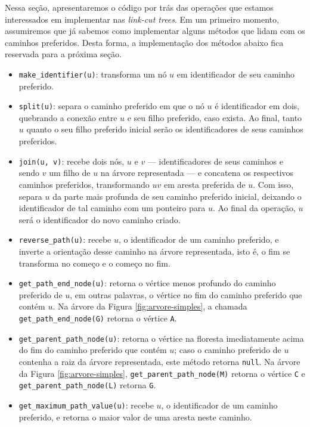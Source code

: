 Nessa seção, apresentaremos o código por trás das operações que estamos interessados em implementar nas \emph{link-cut trees}. Em um primeiro momento, assumiremos que já sabemos como implementar alguns métodos que lidam com os caminhos preferidos. Desta forma, a implementação dos métodos abaixo fica reservada para a próxima seção.

\begin{itemize}
    \item \texttt{make\_identifier(u)}: transforma um nó $u$ em identificador de seu caminho preferido.
    \item \texttt{split(u)}: separa o caminho preferido em que o nó $u$ é identificador em dois, quebrando a conexão entre $u$ e seu filho preferido, caso exista. Ao final, tanto $u$ quanto o seu filho preferido inicial serão os identificadores de seus caminhos preferidos.
    \item \texttt{join(u, v)}: recebe dois nós, $u$ e $v$ --- identificadores de seus caminhos e sendo $v$ um filho de $u$ na árvore representada --- e concatena os respectivos caminhos preferidos, transformando $uv$ em aresta preferida de $u$. Com isso, separa $u$ da parte mais profunda de seu caminho preferido inicial, deixando o identificador de tal caminho com um ponteiro para $u$. Ao final da operação, $u$ será o identificador do novo caminho criado.
    \item \texttt{reverse\_path(u)}: recebe $u$, o identificador de um caminho preferido, e inverte a orientação desse caminho na árvore representada, isto é, o fim se transforma no começo e o começo no fim.
    \item \texttt{get\_path\_end\_node(u)}: retorna o vértice menos profundo do caminho preferido de $u$, em outras palavras, o vértice no fim do caminho preferido que contém $u$. Na árvore da Figura \ref{fig:arvore-simples}, a chamada \texttt{get\_path\_end\_node(G)} retorna o vértice \texttt{A}.
    \item \texttt{get\_parent\_path\_node(u)}: retorna o vértice na floresta imediatamente acima do fim do caminho preferido que contém $u$; caso o caminho preferido de $u$ contenha a raiz da árvore representada, este método retorna \texttt{null}. Na árvore da Figura \ref{fig:arvore-simples}, \texttt{get\_parent\_path\_node(M)} retorna o vértice \texttt{C} e \texttt{get\_parent\_path\_node(L)} retorna \texttt{G}.
    \item \texttt{get\_maximum\_path\_value(u)}: recebe $u$, o identificador de um caminho preferido, e retorna o maior valor de uma aresta neste caminho.
\end{itemize}

